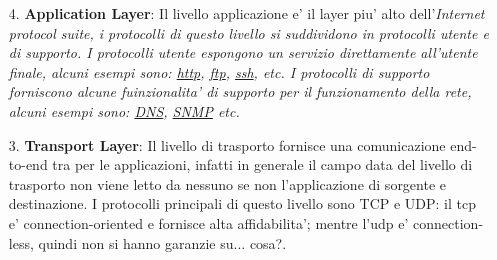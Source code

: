 \begin{enumerate} %
    \item[4.] \textbf{Application Layer}: Il livello applicazione e' il layer piu' alto dell'\it{Internet protocol suite}, i protocolli di questo livello si suddividono in protocolli utente e di supporto. \newline
    I protocolli utente espongono un servizio direttamente all'utente finale, alcuni esempi sono: \href{https://en.wikipedia.org/wiki/Hypertext_Transfer_Protocol}{http}, \href{https://en.wikipedia.org/wiki/File_Transfer_Protocol}{ftp}, \href{https://en.wikipedia.org/wiki/Secure_Shell}{ssh}, etc. \newline
    I protocolli di supporto forniscono alcune fuinzionalita' di supporto per il funzionamento della rete, alcuni esempi sono: \href{https://en.wikipedia.org/wiki/Domain_Name_System}{DNS}, \href{https://en.wikipedia.org/wiki/Simple_Network_Management_Protocol}{SNMP} etc.



    \item[3.] \textbf{Transport Layer}: Il livello di trasporto fornisce una comunicazione end-to-end tra per le applicazioni, infatti in generale il campo data del livello di trasporto non viene letto da nessuno se non l'applicazione di sorgente e destinazione. \newline
    I protocolli principali di questo livello sono TCP e UDP: il tcp e' connection-oriented e fornisce alta affidabilita'; mentre l'udp e' connection-less, quindi non si hanno garanzie su... cosa?. %
    

\end{enumerate}
